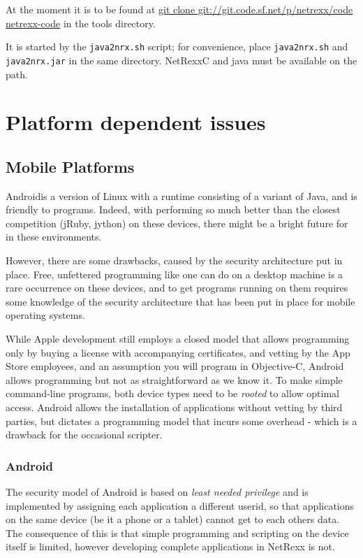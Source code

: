 {At the moment it is to be found at \url{git clone git://git.code.sf.net/p/netrexx/code netrexx-code} in the tools directory.

It is started by the \texttt{java2nrx.sh} script; for convenience, place \texttt{java2nrx.sh} and \texttt{java2nrx.jar} in the
same directory. NetRexxC and java must be available on the path.


\chapter{Platform dependent issues}
\section{Mobile Platforms}
Android\texttrademark is a version of Linux with a runtime consisting
of a variant of Java, and is friendly to \nr{}
programs. Indeed, with \nr{} performing so much better than the closest
competition (jRuby, jython) on these devices, there might be a bright
future for \nr{} in these environments. 

However, there are some drawbacks, caused by the security architecture
put in place. Free, unfettered programming like one can do on a
desktop machine is a rare occurrence on these devices, and to get
programs running on them requires some knowledge of the security
architecture that has been put in place for mobile operating systems.

While Apple development still employs a closed model that allows programming only by
buying a license with accompanying certificates, and vetting by the
App Store employees, and an assumption you will program in
Objective-C, Android allows programming but not as straightforward as
we know it. To make simple command-line \nr{} programs, both device
types need to be \emph{rooted} to allow optimal access. Android allows
the installation of applications without vetting by third parties, but
dictates a programming model that incurs some overhead - which is a
drawback for the occasional scripter.
\subsection{Android}
The security model of Android is based on \emph{least needed
  privilege} and is implemented by assigning each application a
different userid, so that applications on the same device (be it a
phone or a tablet) cannot get to each others data. The consequence of
this is that simple \nr{} programming and scripting on the device itself is limited, however developing complete applications in NetRexx is not.

}
